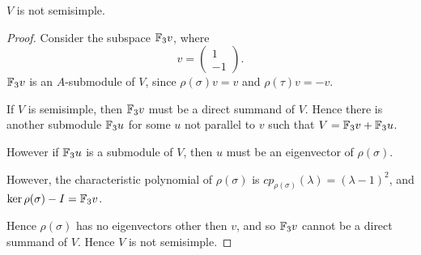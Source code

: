 \documentclass{unswmaths}
\begin{document}
\begin{proposition}
\label{notSemisimple}
    $V$ is not semisimple.
\end{proposition}
\begin{proof}
    Consider the subspace ${\mathbb{F}_3} v$, where
    \begin{equation*}
        v = \begin{pmatrix}
            1\\-1
        \end{pmatrix}.
    \end{equation*}
    ${\mathbb{F}_3} v$ is an $A$-submodule of $V$, since $\rho(\sigma)v = v$ and 
    $\rho(\tau)v = -v$.
    
    If $V$ is semisimple, then ${\mathbb{F}_3} v$ must be a direct summand of $V$. Hence there
    is another submodule ${\mathbb{F}_3} u$ for some $u$ not parallel to $v$ such that
    $V = {\mathbb{F}_3} v+{\mathbb{F}_3} u$.
    
    However if ${\mathbb{F}_3} u$ is a submodule of $V$, then $u$ must be an eigenvector
    of $\rho(\sigma)$. 
    
    However, the characteristic polynomial of $\rho(\sigma)$ is 
    $cp_{\rho(\sigma)}(\lambda) = (\lambda-1)^2$, and $\ker \rho(\sigma)-I = {\mathbb{F}_3} v$.
    
    Hence $\rho(\sigma)$ has no eigenvectors other then $v$, and so ${\mathbb{F}_3} v$ cannot
    be a direct summand of $V$. Hence $V$ is not semisimple.
\end{proof}
\end{document}
